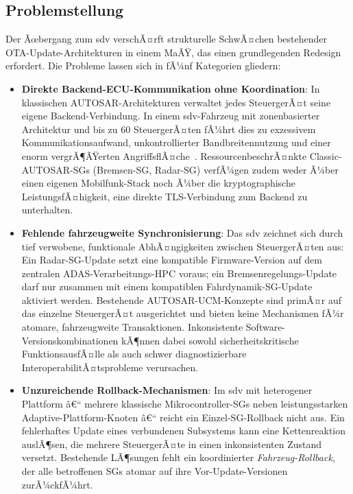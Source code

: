 ﻿\documentclass[12pt,a4paper,twoside]{article}
\begin{document}
\subsection{Problemstellung}
\label{subsec:problemstellung}

Der Ãœbergang zum \gls{sdv} verschÃ¤rft strukturelle SchwÃ¤chen bestehender
OTA-Update-Architekturen in einem MaÃŸ, das einen grundlegenden Redesign
erfordert. Die Probleme lassen sich in fÃ¼nf Kategorien gliedern:

\begin{itemize}[leftmargin=*]
  \item \textbf{Direkte Backend-ECU-Kommunikation ohne Koordination}:
    In klassischen AUTO\-SAR-Architekturen verwaltet jedes SteuergerÃ¤t
    seine eigene Backend-Verbindung. In einem \gls{sdv}-Fahrzeug mit
    zonenbasierter Architektur und bis zu 60 SteuergerÃ¤ten fÃ¼hrt dies
    zu exzessivem Kommunikationsaufwand, unkontrollierter Bandbreitennutzung
    und einer enorm vergrÃ¶ÃŸerten AngriffsflÃ¤che~\cite{halder2020secure}.
    RessourcenbeschrÃ¤nkte Classic-AUTOSAR-SGs (Bremsen-SG, Radar-SG)
    verfÃ¼gen zudem weder Ã¼ber einen eigenen Mobilfunk-Stack noch Ã¼ber
    die kryptographische LeistungsfÃ¤higkeit, eine direkte TLS-Verbindung
    zum Backend zu unterhalten.

  \item \textbf{Fehlende fahrzeugweite Synchronisierung}:
    Das \gls{sdv} zeichnet sich durch tief verwobene, funktionale
    AbhÃ¤ngigkeiten zwischen SteuergerÃ¤ten aus: Ein Radar-SG-Update
    setzt eine kompatible Firmware-Version auf dem zentralen
    ADAS-Verarbeitungs-HPC voraus; ein Bremsenregelungs-Update
    darf nur zusammen mit einem kompatiblen Fahrdynamik-SG-Update
    aktiviert werden. Bestehende AUTOSAR-UCM-Konzepte sind primÃ¤r
    auf das einzelne SteuergerÃ¤t ausgerichtet und bieten keine
    Mechanismen fÃ¼r atomare, fahrzeugweite Transaktionen.
    Inkonsistente Software-Versionskombinationen kÃ¶nnen dabei
    sowohl sicherheitskritische FunktionsausfÃ¤lle als auch
    schwer diagnostizierbare InteroperabilitÃ¤tsprobleme verursachen.

  \item \textbf{Unzureichende Rollback-Mechanismen}:
    Im \gls{sdv} mit heterogener Plattform â€“ mehrere klassische
    Mikrocontroller-SGs neben leistungsstarken Adaptive-Plattform-Knoten â€“
    reicht ein Einzel-SG-Rollback nicht aus. Ein fehlerhaftes Update
    eines verbundenen Subsystems kann eine Kettenreaktion auslÃ¶sen,
    die mehrere SteuergerÃ¤te in einen inkonsistenten Zustand versetzt.
    Bestehende LÃ¶sungen fehlt ein koordinierter \emph{Fahrzeug-Rollback},
    der alle betroffenen SGs atomar auf ihre Vor-Update-Versionen
    zurÃ¼ckfÃ¼hrt.


\end{itemize}
\end{document}
